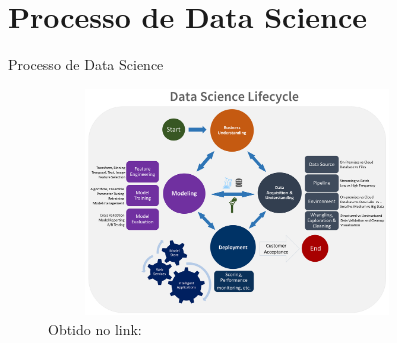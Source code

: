 \section{Processo de Data Science}

\begin{frame}	
	\begin{block}{Processo de Data Science}	
		\begin{figure}[!htb]
			\centering	  				
			\includegraphics[height=6cm, width = 10cm]{./pic/dsprocess.png}
			\caption{Obtido no link: \href{https://docs.microsoft.com/en-us/azure/machine-learning/team-data-science-process/overview}{\color{blue}{Microsoft} }}
			\label{fig_ds_process}
		\end{figure}	
	\end{block}
\end{frame}
